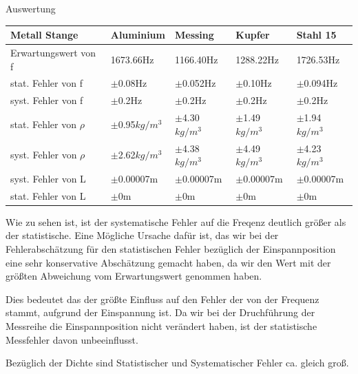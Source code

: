 \documentclass[twoside]{protokoll}
\begin{document}
\begin{aufgabe}{Auswertung}
 \begin{table}[H]
        \centering
        \begin{tabularx}{1\textwidth}{l X X X X} %
            \toprule
            \textbf{Metall Stange} & \textbf{Aluminium} & \textbf{Messing} & \textbf{Kupfer} & \textbf{Stahl 15} \\
            \midrule
            Erwartungswert von f & 1673.66Hz & 1166.40Hz & 1288.22Hz & 1726.53Hz \\
            stat. Fehler von f & $\pm$0.08Hz & $\pm$0.052Hz & $\pm$0.10Hz & $\pm$0.094Hz \\
            syst. Fehler von f & $\pm$0.2Hz & $\pm$0.2Hz & $\pm$0.2Hz & $\pm$0.2Hz \\
            \midrule
            stat. Fehler von $\rho$ & $\pm$0.95$kg/m^3$ & $\pm$4.30$kg/m^3$ & $\pm$1.49$kg/m^3$ & $\pm$1.94$kg/m^3$ \\
            syst. Fehler von $\rho$ & $\pm$2.62$kg/m^3$ & $\pm$4.38$kg/m^3$ & $\pm$4.49$kg/m^3$ & $\pm$4.23$kg/m^3$ \\
            \midrule
            syst. Fehler von L      & $\pm$0.00007m     & $\pm$0.00007m     & $\pm$0.00007m     & $\pm$0.00007m \\
            stat. Fehler von L      & $\pm$0m     & $\pm$0m     & $\pm$0m     & $\pm$0m \\
            \bottomrule
        \end{tabularx}
    \end{table}
Wie zu sehen ist, ist der systematische Fehler auf die Freqenz deutlich größer als der statistische.
Eine Mögliche Ursache dafür ist, das wir bei der Fehlerabschätzung für den statistischen Fehler bezüglich der Einspannposition eine sehr konservative Abschätzung gemacht haben,
da wir den Wert mit der größten Abweichung vom Erwartungswert genommen haben.

Dies bedeutet das der größte Einfluss auf den Fehler der von der Frequenz stammt, aufgrund der Einspannung ist.
Da wir bei der Druchführung der Messreihe die Einspannposition nicht verändert haben, ist der statistische Messfehler davon unbeeinflusst.

Bezüglich der Dichte sind Statistischer und Systematischer Fehler ca. gleich groß. \\
 

\end{aufgabe}
\end{document}
